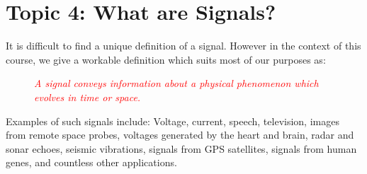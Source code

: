 \documentclass[../notes-main.tex]{subfiles}
\begin{document}
\section{Topic 4: What are Signals?}
It is difficult to find a unique definition of a signal. However in the context of this course, we give a workable definition which suits most of our purposes as:
\begin{figure}[H]
    \centering
    \begin{mdframed}
        \begin{center}
            \textcolor{red}{%
                \emph{A signal conveys information about a physical phenomenon which evolves in time or space.}}
        \end{center}
    \end{mdframed}\label{fig:signal-def-1}
    \vspace{-1em}
\end{figure}
\vspace{-1em}
\noindent Examples of such signals include: Voltage, current, speech, television, images from remote space probes, voltages generated by the heart and brain, radar and sonar echoes, seismic vibrations, signals from GPS satellites, signals from human genes, and countless other applications.
\end{document}
